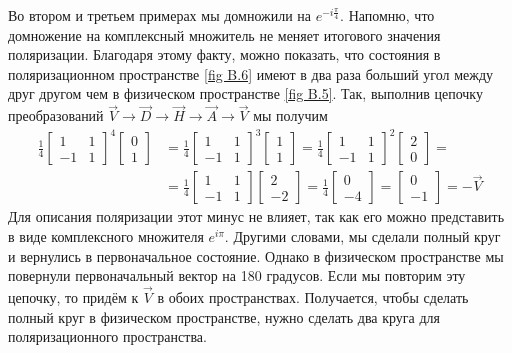 Во втором и третьем примерах мы домножили на $e^{-i\frac{\pi}{4}}$. Напомню, что домножение на комплексный множитель не меняет итогового значения поляризации. Благодаря этому факту, можно показать, что состояния в поляризационном пространстве \ref{fig B.6} имеют в два раза больший угол между друг другом чем в физическом пространстве \ref{fig B.5}. Так, выполнив цепочку преобразований $\vec{V} \rightarrow \vec{D} \rightarrow \vec{H} \rightarrow \vec{A} \rightarrow \vec{V}$ мы получим
\begin{align*}
\frac{1}{4}\begin{bmatrix} 1 & 1 \\ -1 & 1 \end{bmatrix}^4\begin{bmatrix} 0 \\ 1 \end{bmatrix} &= \frac{1}{4}\begin{bmatrix} 1 & 1 \\ -1 & 1 \end{bmatrix}^3\begin{bmatrix} 1 \\ 1 \end{bmatrix} = \frac{1}{4}\begin{bmatrix} 1 & 1 \\ -1 & 1 \end{bmatrix}^2\begin{bmatrix} 2 \\ 0 \end{bmatrix} = \\
&=\frac{1}{4}\begin{bmatrix} 1 & 1 \\ -1 & 1 \end{bmatrix}\begin{bmatrix} 2 \\ -2 \end{bmatrix} = \frac{1}{4}\begin{bmatrix} 0 \\ -4 \end{bmatrix} = \begin{bmatrix} 0 \\ -1 \end{bmatrix} = -\vec{V}
\end{align*}
Для описания поляризации этот минус не влияет, так как его можно представить в виде комплексного множителя $e^{i\pi}$. Другими словами, мы сделали полный круг и вернулись в первоначальное состояние. Однако в физическом пространстве мы повернули первоначальный вектор на 180 градусов. Если мы повторим эту цепочку, то придём к $\vec{V}$ в обоих пространствах. Получается, чтобы сделать полный круг в физическом пространстве, нужно сделать два круга для поляризационного пространства.

